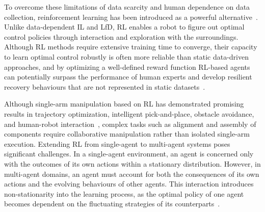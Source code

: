 To overcome these limitations of data scarcity and human dependence on data collection,
reinforcement learning has been introduced as a powerful alternative~\citep{kober2013reinforcement}.
Unlike data-dependent IL and LfD, RL enables a robot to figure out optimal control policies through
interaction and exploration with the surroundings. Although RL methods require extensive training
time to converge, their capacity to learn optimal control robustly is often more reliable than
static data-driven approaches, and by optimizing a well-defined reward function RL-based agents can
potentially surpass the performance of human experts and develop resilient recovery behaviours that
are not represented in static datasets~\citep{gu2017deep}.

Although single-arm manipulation based on RL has demonstrated promising results in trajectory
optimization, intelligent pick-and-place, obstacle avoidance, and human-robot
interaction~\citep{yang2025gbagcrl}, complex tasks such as alignment and assembly of components
require collaborative manipulation rather than isolated single-arm execution. Extending RL from
single-agent to multi-agent systems poses significant challenges. In a single-agent environment, an
agent is concerned only with the outcomes of its own actions within a stationary distribution.
However, in multi-agent domains, an agent must account for both the consequences of its own actions
and the evolving behaviours of other agents. This interaction introduces non-stationarity into the
learning process, as the optimal policy of one agent becomes dependent on the fluctuating strategies
of its counterparts~\citep{nguyen2020deep}.

